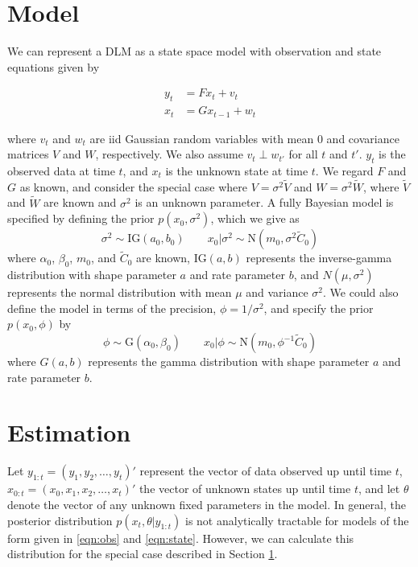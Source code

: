 \documentclass{article}
\begin{document}
\section{Model} \label{sec:model}

We can represent a DLM as a state space model with observation and state equations given by

\begin{align}
y_t &= Fx_t + v_t \label{eqn:obs} \\
x_t &= Gx_{t-1} + w_t \label{eqn:state}
\end{align}

\noindent where $v_t$ and $w_t$ are iid Gaussian random variables with mean 0 and covariance matrices $V$ and $W$, respectively. We also assume $v_t \perp w_{t'}$ for all $t$ and $t'$. $y_t$ is the observed data at time $t$, and $x_t$ is the unknown state at time $t$. We regard $F$ and $G$ as known, and consider the special case where $V = \sigma^2\tilde{V}$ and $W = \sigma^2\tilde{W}$, where $\tilde{V}$ and $\tilde{W}$ are known and $\sigma^2$ is an unknown parameter. A fully Bayesian model is specified by defining the prior $p(x_0,\sigma^2)$, which we give as \[\sigma^2 \sim \mbox{IG}(a_0,b_0) \qquad x_0|\sigma^2 \sim \mbox{N}(m_0,\sigma^2\tilde{C}_0)\]
\noindent where $\alpha_0$, $\beta_0$, $m_0$, and $\tilde{C}_0$ are known, $\mbox{IG}(a,b)$ represents the inverse-gamma distribution with shape parameter $a$ and rate parameter $b$, and $N(\mu,\sigma^2)$ represents the normal distribution with mean $\mu$ and variance $\sigma^2$. We could also define the model in terms of the precision, $\phi = 1 / \sigma^2$, and specify the prior $p(x_0,\phi)$ by \[\phi \sim \mbox{G}(\alpha_0,\beta_0) \qquad x_0|\phi \sim \mbox{N}(m_0,\phi^{-1}\tilde{C}_0)\]
\noindent where $G(a,b)$ represents the gamma distribution with shape parameter $a$ and rate parameter $b$.

\section{Estimation} \label{sec:estimation}

Let $y_{1:t} = (y_1,y_2,\ldots,y_t)'$ represent the vector of data observed up until time $t$, $x_{0:t} = (x_0,x_1,x_2,\ldots,x_t)'$ the vector of unknown states up until time $t$, and let $\theta$ denote the vector of any unknown fixed parameters in the model. In general, the posterior distribution $p(x_t,\theta|y_{1:t})$ is not analytically tractable for models of the form given in \eqref{eqn:obs} and \eqref{eqn:state}. However, we can calculate this distribution for the special case described in Section \ref{sec:model}.
\end{document}
